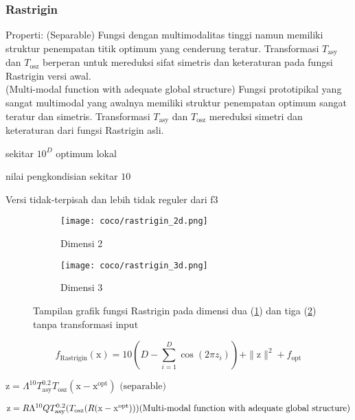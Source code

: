 \subsubsection{Rastrigin}
\noindent Properti:
(Separable) Fungsi dengan multimodalitas tinggi namun memiliki struktur penempatan titik optimum yang cenderung teratur. Transformasi $T_{\text{asy}}$ dan $T_{\text{osz}}$ berperan untuk mereduksi sifat simetris dan keteraturan pada fungsi Rastrigin versi awal.\\
(Multi-modal function with adequate global structure) Fungsi prototipikal yang sangat multimodal yang awalnya memiliki struktur penempatan optimum sangat teratur dan simetris. Transformasi $T_{\text{asy}}$ dan $T_{\text{osz}}$ mereduksi simetri dan keteraturan dari fungsi Rastrigin asli.
\begin{packed_item}
  \item sekitar $10^D$ optimum lokal
  \item nilai pengkondisian sekitar $10$
  \item Versi tidak-terpisah dan lebih tidak reguler dari f3
\end{packed_item}
\begin{figure}[H]
	\centering
	\begin{subfigure}[b]{0.4\textwidth}
		\centering
		\texttt{[image: coco/rastrigin\_2d.png]}
		\caption{Dimensi 2}
		\label{fig:rastrigin_coco_2d}
	\end{subfigure}
	\hfill
	\begin{subfigure}[b]{0.4\textwidth}
		\centering
		\texttt{[image: coco/rastrigin\_3d.png]}
		\caption{Dimensi 3}
		\label{fig:rastrigin_coco_3d}
	\end{subfigure}
	\caption{Tampilan grafik fungsi Rastrigin pada dimensi dua (\cref{fig:rastrigin_coco_2d}) dan tiga (\cref{fig:rastrigin_coco_3d}) tanpa transformasi input}
	\label{fig:rastrigin_coco}
\end{figure}
\begin{equation}
  f_{\text{Rastrigin}}(\mathrm{x})=10(D-\sum_{i=1}^{D}\cos(2\pi z_i))+\|\mathrm{z}\|^2+f_{\text{opt}}
\end{equation}
\begin{packed_item}
    \item $\mathrm{z}=\Lambda^{10}T_{\text{asy}}^{0.2}T_{\text{osz}}(\mathrm{x}-\mathrm{x}^{\text{opt}})\text{ (separable)}$\\
    \item $\mathrm{z}=R\Lambda^{10}Q T_{\text{asy}}^{0.2}(T_{\text{osz}}(R(\mathrm{x}-\mathrm{x}^{\text{opt}})))\\\text{(Multi-modal function with adequate global structure)}$
\end{packed_item}

